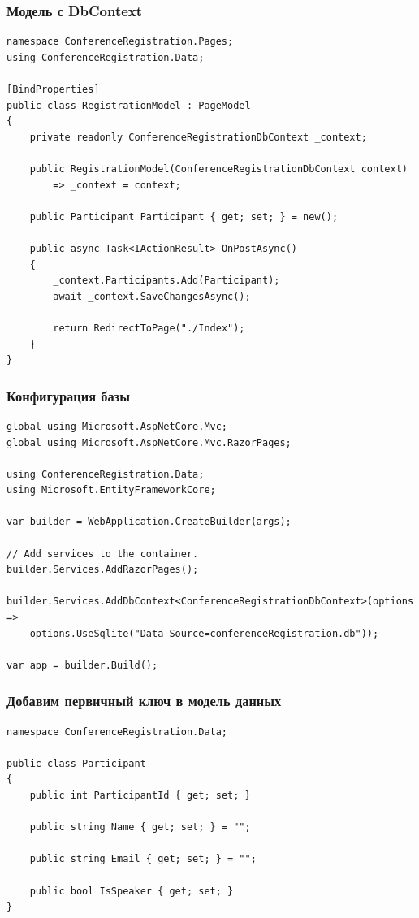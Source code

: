 \documentclass{../../slides-style}
\begin{document}
    \begin{frame}[fragile]
        \frametitle{Модель с DbContext}
        \begin{scriptsize}
            \begin{verbatim}
namespace ConferenceRegistration.Pages;
using ConferenceRegistration.Data;

[BindProperties]
public class RegistrationModel : PageModel
{
    private readonly ConferenceRegistrationDbContext _context;

    public RegistrationModel(ConferenceRegistrationDbContext context)
        => _context = context;

    public Participant Participant { get; set; } = new();

    public async Task<IActionResult> OnPostAsync()
    {
        _context.Participants.Add(Participant);
        await _context.SaveChangesAsync();

        return RedirectToPage("./Index");
    }
}
            \end{verbatim}
        \end{scriptsize}
    \end{frame}

    \begin{frame}[fragile]
        \frametitle{Конфигурация базы}
        \begin{footnotesize}
            \begin{verbatim}
global using Microsoft.AspNetCore.Mvc;
global using Microsoft.AspNetCore.Mvc.RazorPages;

using ConferenceRegistration.Data;
using Microsoft.EntityFrameworkCore;

var builder = WebApplication.CreateBuilder(args);

// Add services to the container.
builder.Services.AddRazorPages();

builder.Services.AddDbContext<ConferenceRegistrationDbContext>(options =>
    options.UseSqlite("Data Source=conferenceRegistration.db"));

var app = builder.Build();
            \end{verbatim}
        \end{footnotesize}
    \end{frame}

    \begin{frame}[fragile]
        \frametitle{Добавим первичный ключ в модель данных}
        \begin{footnotesize}
            \begin{verbatim}
namespace ConferenceRegistration.Data;

public class Participant
{
    public int ParticipantId { get; set; }

    public string Name { get; set; } = "";

    public string Email { get; set; } = "";

    public bool IsSpeaker { get; set; }
}
            \end{verbatim}
        \end{footnotesize}
    \end{frame}
\end{document}
